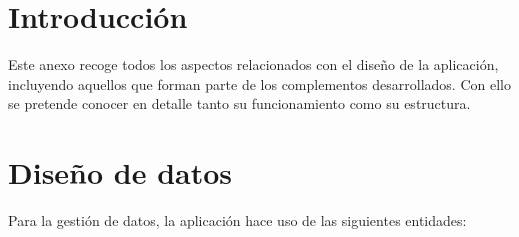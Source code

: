 
\section{Introducción}

Este anexo recoge todos los aspectos relacionados con el diseño de la
aplicación, incluyendo aquellos que forman parte de los complementos
desarrollados. Con ello se pretende conocer en detalle tanto su
funcionamiento como su estructura.


\section{Diseño de datos}

Para la gestión de datos, la aplicación hace uso de las siguientes
entidades:

